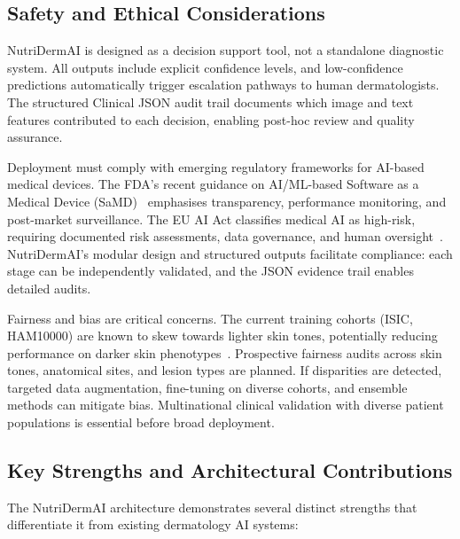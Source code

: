 \documentclass[conference]{IEEEtran}
\begin{document}
\subsection{Safety and Ethical Considerations}

NutriDermAI is designed as a decision support tool, not a standalone
diagnostic system. All outputs include explicit confidence levels, and
low-confidence predictions automatically trigger escalation pathways to
human dermatologists. The structured Clinical JSON audit trail documents
which image and text features contributed to each decision, enabling
post-hoc review and quality assurance.

Deployment must comply with emerging regulatory frameworks for AI-based
medical devices. The FDA's recent guidance on AI/ML-based Software as a
Medical Device (SaMD)~\cite{fda2021_aiml_samd} emphasises transparency,
performance monitoring, and post-market surveillance. The EU AI Act
classifies medical AI as high-risk, requiring documented risk assessments,
data governance, and human oversight~\cite{euaiact2024}. NutriDermAI's
modular design and structured outputs facilitate compliance: each stage
can be independently validated, and the JSON evidence trail enables
detailed audits.

Fairness and bias are critical concerns. The current training cohorts
(ISIC, HAM10000) are known to skew towards lighter skin tones, potentially
reducing performance on darker skin phenotypes~\cite{kinyanjui2021_color_bias_skin,
buolamwini2019_gender_shades}. Prospective fairness audits across skin
tones, anatomical sites, and lesion types are planned. If disparities are
detected, targeted data augmentation, fine-tuning on diverse cohorts, and
ensemble methods can mitigate bias. Multinational clinical validation with
diverse patient populations is essential before broad deployment.

\subsection{Key Strengths and Architectural Contributions}

The NutriDermAI architecture demonstrates several distinct strengths that
differentiate it from existing dermatology AI systems:
\end{document}
